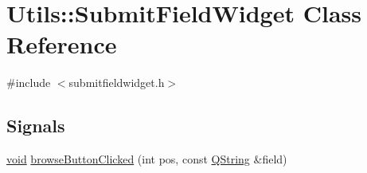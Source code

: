 \hypertarget{class_utils_1_1_submit_field_widget}{\section{\-Utils\-:\-:\-Submit\-Field\-Widget \-Class \-Reference}
\label{class_utils_1_1_submit_field_widget}
}


{\ttfamily \#include $<$submitfieldwidget.\-h$>$}

\subsection*{\-Signals}
\begin{DoxyCompactItemize}
\item 
\hyperlink{group___u_a_v_objects_plugin_ga444cf2ff3f0ecbe028adce838d373f5c}{void} \hyperlink{class_utils_1_1_submit_field_widget_adc7d1b6d1536cfcb44cabe89c27bfeec}{browse\-Button\-Clicked} (int pos, const \hyperlink{group___u_a_v_objects_plugin_gab9d252f49c333c94a72f97ce3105a32d}{\-Q\-String} \&field)
\end{DoxyCompactItemize}
